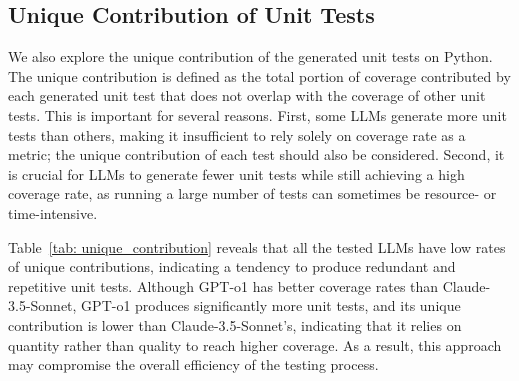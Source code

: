 




\subsection{Unique Contribution of Unit Tests}
\label{sec: unique}
We also explore the unique contribution of the generated unit tests on Python.
The unique contribution is defined as the total portion of coverage contributed by each generated unit test that does not overlap with the coverage of other unit tests. 
This is important for several reasons. First, some LLMs generate more unit tests than others, making it insufficient to rely solely on coverage rate as a metric; the unique contribution of each test should also be considered. Second, it is crucial for LLMs to generate fewer unit tests while still achieving a high coverage rate, as running a large number of tests can sometimes be resource- or time-intensive.

Table~\ref{tab: unique_contribution} reveals that all the tested LLMs have low rates of unique contributions, indicating a tendency to produce redundant and repetitive unit tests. 
Although GPT-o1 has better coverage rates than Claude-3.5-Sonnet, GPT-o1 produces significantly more unit tests, and its unique contribution is lower than Claude-3.5-Sonnet’s, indicating that it relies on quantity rather than quality to reach higher coverage. 
As a result, this approach may compromise the overall efficiency of the testing process.


